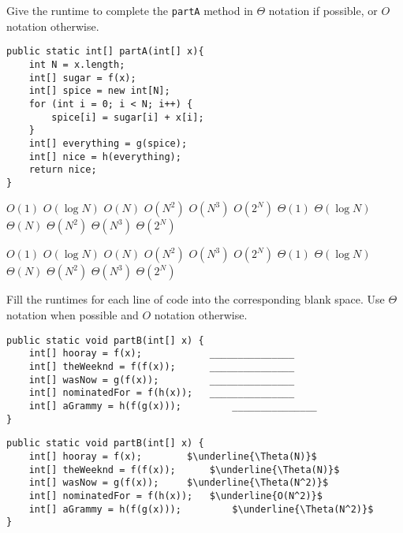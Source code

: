 \question Give the runtime to complete the \lstinline{partA} method in $\Theta$ notation if possible, or $O$ notation otherwise.

\begin{lstlisting}
public static int[] partA(int[] x){
    int N = x.length;
    int[] sugar = f(x); 
    int[] spice = new int[N]; 
    for (int i = 0; i < N; i++) { 
        spice[i] = sugar[i] + x[i];
    }
    int[] everything = g(spice); 
    int[] nice = h(everything); 
    return nice;
}
\end{lstlisting}

\ifprintanswers\else
\begin{oneparcheckboxes}
\choice $O(1)$ \choice $O(\log N)$
\choice $O(N)$
\choice $O(N^2)$
\choice $O(N^3)$
\choice $O(2^N)$
\choice $\Theta(1)$
\choice $\Theta(\log N)$
\choice $\Theta(N)$
\choice $\Theta(N^2)$
\choice $\Theta(N^3)$
\choice $\Theta(2^N)$
\end{oneparcheckboxes}
\fi

\begin{solution}
\begin{oneparcheckboxes}
\choice $O(1)$ \choice $O(\log N)$
\choice $O(N)$
\choice $O(N^2)$
\choice $O(N^3)$
\choice $O(2^N)$
\choice $\Theta(1)$
\choice $\Theta(\log N)$
\choice $\Theta(N)$
\CorrectChoice $\Theta(N^2)$
\choice $\Theta(N^3)$
\choice $\Theta(2^N)$
\end{oneparcheckboxes}
\end{solution}

\question Fill the runtimes for each line of code into the corresponding blank space. Use $\Theta$ notation when possible and $O$ notation otherwise.

\ifprintanswers\else
\begin{lstlisting}
public static void partB(int[] x) { 
    int[] hooray = f(x); 	        _______________
    int[] theWeeknd = f(f(x));		_______________
    int[] wasNow = g(f(x)); 		_______________
    int[] nominatedFor = f(h(x));	_______________
    int[] aGrammy = h(f(g(x)));         _______________
}
\end{lstlisting}
\fi

\begin{solution}
\begin{lstlisting}[mathescape=true]
public static void partB(int[] x) { 
    int[] hooray = f(x); 		$\underline{\Theta(N)}$
    int[] theWeeknd = f(f(x));		$\underline{\Theta(N)}$
    int[] wasNow = g(f(x));		$\underline{\Theta(N^2)}$
    int[] nominatedFor = f(h(x));	$\underline{O(N^2)}$
    int[] aGrammy = h(f(g(x)));	        $\underline{\Theta(N^2)}$
}
\end{lstlisting}
\end{solution}
